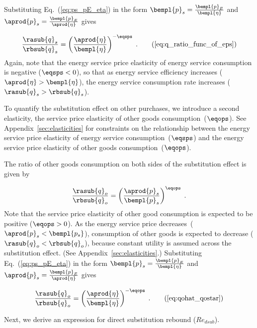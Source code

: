 Substituting Eq.~(\ref{eq:ps_pE_eta}) in the form
$\bempl{p}_s = \frac{\bempl{p}_E}{\bempl{\eta}}$ and
$\aprod{p}_s = \frac{\bempl{p}_E}{\aprod{\eta}}$
gives

\begin{equation}
  \frac{\rasub{q}_s}{\rbsub{q}_s} = \left( \frac{\aprod{\eta}}{\bempl{\eta}} \right)^{-\eqsps} \; .
                                                                        \tag{\ref{eq:q_ratio_func_of_eps}}
\end{equation}
%
Again, note that the energy service price elasticity of energy service consumption
is negative ($\eqsps < 0$), so that
as energy service efficiency increases ($\aprod{\eta} > \bempl{\eta}$),
the energy service consumption rate increases ($\rasub{q}_s > \rbsub{q}_s$).

To quantify the substitution effect on other purchases,
we introduce a second elasticity, 
the service price elasticity of other goods consumption~($\eqops$).
See Appendix~\ref{sec:elasticities} for constraints on the relationship between the
energy service price elasticity of energy service consumption~($\eqsps$) and the
energy service price elasticity of other goods consumption~($\eqops$).

The ratio of other goods consumption on both sides of the substitution effect is given by

\begin{equation}
  \frac{\rasub{q}_o}{\rbsub{q}_o} = \left( \frac{\aprod{p}_s}{\bempl{p}_s} \right) ^ {\eqops} \; . 
\end{equation}
%
Note that the service price elasticity of other good consumption
is expected to be positive ($\eqops > 0$).
As the energy service price decreases~($\aprod{p}_s < \bempl{p_s}$), 
consumption of other goods is expected to decrease ($\rasub{q}_o < \rbsub{q}_o$), 
because constant utility is assumed across the substitution effect.
(See Appendix~\ref{sec:elasticities}.)
Substituting Eq.~(\ref{eq:ps_pE_eta}) in the form
$\bempl{p}_s = \frac{\bempl{p}_E}{\bempl{\eta}}$ and
$\aprod{p}_s = \frac{\bempl{p}_E}{\aprod{\eta}}$
gives

\begin{equation}
  \frac{\rasub{q}_o}{\rbsub{q}_o} = \left( \frac{\aprod{\eta}}{\bempl{\eta}} \right) ^ {-\eqops} \; . 
                                                                                              \tag{\ref{eq:qohat_qostar}}
\end{equation}

Next, we derive an expression for direct substitution rebound ($Re_{dsub}$).


